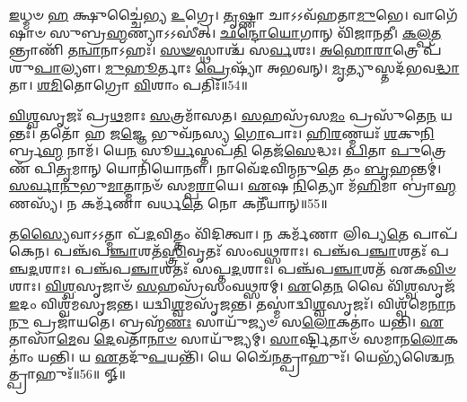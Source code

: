    \ul{𑌇}\-𑌧𑍍𑌮𑍞 \ul{𑌹} 𑌕𑍍𑌷𑍁𑌚𑍍𑌚𑍈॑𑌭𑍍𑌯 \ul{𑌉}\-𑌗𑍍𑌰𑍇।
   \ul{𑌤𑍃}\-𑌷𑍍𑌣𑌾 𑌚𑌾𑌽𑌽𑌵᳴𑌹𑌤𑌾\-\ul{𑌮𑍁}\-𑌭𑍇।
   𑌵𑌾𑌗𑍇᳴𑌷𑌾𑍞 𑌸𑍁𑌬𑍍𑌰\-\ul{𑌹𑍍𑌮}\-𑌣𑍍𑌯𑌾𑌽𑌽𑌸𑍀॑𑌤𑍍।
   \ul{𑌛}\-\-\ul{𑌨𑍍𑌦𑍋}\-\-\ul{𑌯𑍋}\-𑌗𑌾𑌨𑍍 𑌵𑌿᳴𑌜𑌾\-\ul{𑌨}\-𑌤𑍀।
   \ul{𑌕}\-\-\ul{𑌲𑍍𑌪}\-\-\ul{𑌤}\-𑌨𑍍𑌤𑍍𑌰𑌾𑌣𑌿᳴ 𑌤\-\ul{𑌨𑍍𑌵𑌾}\-𑌨𑌾𑌽𑌹𑌃᳴।
   \ul{𑌸}\-\-\ul{𑍟}\-𑌸𑍍𑌥𑌾𑌶𑍍𑌚᳴ 𑌸\-\ul{𑌰𑍍𑌵}\-𑌶𑌃।
   \ul{𑌅}\-\-\ul{𑌹𑍋}\-\-\ul{𑌰𑌾}\-𑌤𑍍𑌰𑍇 𑌪᳴𑌶𑍁\-\ul{𑌪𑌾}\-𑌲𑍍𑌯𑍗।
   \ul{𑌮𑍁}\-\-\ul{𑌹𑍂}\-𑌰𑍍𑌤𑌾𑌃 \ul{𑌪𑍍𑌰𑍇}\-𑌷𑍍𑌯𑌾᳴ 𑌅𑌭𑌵𑌨𑍍।
   \ul{𑌮𑍃}\-𑌤𑍍𑌯𑍁𑌸𑍍𑌤𑌦᳴𑌭𑌵\-\ul{𑌦𑍍𑌧𑌾}\-𑌤𑌾।
   \ul{𑌶}\-\-\ul{𑌮𑌿}\-𑌤𑍋𑌗𑍍𑌰𑍋 \ul{𑌵𑌿}\-𑌶𑌾𑌂 𑌪𑌤𑌿𑌃᳴॥54॥

   \ul{𑌵𑌿}\-\-\ul{𑌶𑍍𑌵}\-𑌸𑍃𑌜𑌃᳴ 𑌪𑍍𑌰\-\ul{𑌥}\-𑌮𑌾𑌃 \ul{𑌸}\-𑌤𑍍𑌰𑌮𑌾᳴𑌸𑌤।
   \ul{𑌸}\-𑌹𑌸𑍍𑌰᳴𑌸\-\ul{𑌮𑌂} 𑌪𑍍𑌰𑌸𑍁᳴𑌤𑍇\-\ul{𑌨} 𑌯𑌨𑍍𑌤𑌃᳴।
   𑌤𑌤𑍋᳴ 𑌹 𑌜\-\ul{𑌜𑍍𑌞𑍇} 𑌭𑍁𑌵᳴𑌨𑌸𑍍𑌯 \ul{𑌗𑍋}\-𑌪𑌾𑌃।
   \ul{𑌹𑌿}\-\-\ul{𑌰}\-𑌣𑍍𑌮𑌯𑌃᳴ \ul{𑌶}\-𑌕𑍁\-\ul{𑌨𑌿}\-𑌰𑍍𑌬𑍍𑌰\-\ul{𑌹𑍍𑌮} 𑌨𑌾𑌮᳴।
   𑌯𑍇\-\ul{𑌨} 𑌸𑍂\-\ul{𑌰𑍍𑌯}\-𑌸𑍍𑌤𑌪᳴\-\ul{𑌤𑌿} 𑌤𑍇𑌜᳴\-\ul{𑌸𑍇}\-𑌦𑍍𑌧𑌃।
   \ul{𑌪𑌿}\-𑌤𑌾 \ul{𑌪𑍁}\-𑌤𑍍𑌰𑍇𑌣᳴ 𑌪𑌿\-\ul{𑌤𑍃}\-𑌮𑌾𑌨𑍍 𑌯𑍋𑌨𑌿᳴𑌯𑍋𑌨𑍗।
   𑌨𑌾𑌵𑍇᳴𑌦𑌵𑌿𑌨𑍍𑌮𑌨𑍁\-\ul{𑌤𑍇} 𑌤𑌂 \ul{𑌬𑍃}\-𑌹𑌨𑍍𑌤𑌮𑍍॑।
   \ul{𑌸}\-\-\ul{𑌰𑍍𑌵𑌾}\-\-\ul{𑌨𑍁}\-𑌭𑍁\-\ul{𑌮𑌾}\-𑌤𑍍𑌮𑌾𑌨𑍞᳴ 𑌸𑌮𑍍𑌪\-\ul{𑌰𑌾}\-𑌯𑍇।
   \ul{𑌏}\-𑌷 \ul{𑌨𑌿}\-𑌤𑍍𑌯𑍋 𑌮᳴\-\ul{𑌹𑌿}\-𑌮𑌾 𑌬𑍍𑌰𑌾॑\-\ul{𑌹𑍍𑌮}\-𑌣𑌸𑍍𑌯᳴।
   𑌨 𑌕𑌰𑍍𑌮᳴𑌣𑌾 𑌵𑌰𑍍𑌧\-\ul{𑌤𑍇} 𑌨𑍋 𑌕𑌨𑍀᳴𑌯𑌾𑌨𑍍॥55॥

   𑌤\-\ul{𑌸𑍍𑌯𑍈}\-𑌵𑌾𑌽𑌽𑌤𑍍𑌮𑌾 𑌪᳴\-\ul{𑌦}\-𑌵𑌿𑌤𑍍𑌤𑌂 𑌵𑌿᳴𑌦𑌿𑌤𑍍𑌵𑌾।
   𑌨 𑌕𑌰𑍍𑌮᳴𑌣𑌾 𑌲𑌿𑌪𑍍𑌯\-\ul{𑌤𑍇} 𑌪𑌾𑌪᳴𑌕𑍇𑌨।
   𑌪𑌞𑍍𑌚᳴𑌪\-\ul{𑌞𑍍𑌚𑌾}\-𑌶𑌤᳴\-\ul{𑌸𑍍𑌤𑍍𑌰𑌿}\-𑌵𑍃𑌤𑌃᳴ 𑌸𑌂𑌵\-\ul{𑌥𑍍𑌸}\-𑌰𑌾𑌃।
   𑌪𑌞𑍍𑌚᳴𑌪\-\ul{𑌞𑍍𑌚𑌾}\-𑌶𑌤𑌃᳴ 𑌪𑌞𑍍𑌚\-\ul{𑌦}\-𑌶𑌾𑌃।
   𑌪𑌞𑍍𑌚᳴𑌪\-\ul{𑌞𑍍𑌚𑌾}\-𑌶𑌤𑌃᳴ 𑌸𑌪𑍍𑌤\-\ul{𑌦}\-𑌶𑌾𑌃।
   𑌪𑌞𑍍𑌚᳴𑌪\-\ul{𑌞𑍍𑌚𑌾}\-𑌶𑌤᳴ 𑌏𑌕\-\ul{𑌵𑌿}\-\-\ul{𑍞}\-𑌶𑌾𑌃।
   \ul{𑌵𑌿}\-\-\ul{𑌶𑍍𑌵}\-𑌸𑍃𑌜𑌾𑍞᳴ \ul{𑌸}\-𑌹𑌸𑍍𑌰᳴𑌸𑌂𑌵𑌥𑍍𑌸𑌰𑌮𑍍।
   \ul{𑌏}\-𑌤𑍇\-\ul{𑌨} 𑌵𑍈 𑌵𑌿᳴\-\ul{𑌶𑍍𑌵}\-𑌸𑍃𑌜᳴ \ul{𑌇}\-𑌦𑌂 𑌵𑌿𑌶𑍍𑌵᳴𑌮𑌸𑍃𑌜𑌨𑍍𑌤।
   𑌯𑌦𑍍𑌵𑌿\-\ul{𑌶𑍍𑌵}\-𑌮𑌸𑍃᳴𑌜𑌨𑍍𑌤।
   𑌤𑌸𑍍𑌮𑌾॑𑌦𑍍𑌵𑌿\-\ul{𑌶𑍍𑌵}\-𑌸𑍃𑌜𑌃᳴।
   𑌵𑌿𑌶𑍍𑌵᳴𑌮𑍇\-\ul{𑌨𑌾}\-𑌨\-\ul{𑌨𑍁} 𑌪𑍍𑌰𑌜𑌾᳴𑌯𑌤𑍇।
   𑌬𑍍𑌰𑌹𑍍𑌮᳴\-\ul{𑌣𑌃} 𑌸𑌾𑌯𑍁᳴𑌜𑍍𑌯𑍞 𑌸\-\ul{𑌲𑍋}\-𑌕𑌤𑌾𑌂॑ 𑌯𑌨𑍍𑌤𑌿।
   \ul{𑌏}\-𑌤𑌾𑌸𑌾᳴\-\ul{𑌮𑍇}\-𑌵 \ul{𑌦𑍇}\-𑌵𑌤𑌾᳴\-\ul{𑌨𑌾}\-\-\ul{𑍞} 𑌸𑌾𑌯𑍁᳴𑌜𑍍𑌯𑌮𑍍।
   \ul{𑌸𑌾}\-𑌰𑍍𑌷𑍍𑌟𑌿𑌤𑌾𑍞᳴ 𑌸𑌮𑌾𑌨\-\ul{𑌲𑍋}\-𑌕𑌤𑌾𑌂॑ 𑌯𑌨𑍍𑌤𑌿।
   𑌯 \ul{𑌏}\-𑌤𑌦𑍁᳴\-\ul{𑌪}\-𑌯𑌨𑍍𑌤𑌿᳴।
   𑌯𑍇 𑌚𑍈᳴\-\ul{𑌨}\-𑌤𑍍𑌪𑍍𑌰𑌾𑌹𑍁𑌃᳴।
   𑌯𑍇𑌭𑍍𑌯᳴𑌶𑍍𑌚𑍈\-\ul{𑌨}\-𑌤𑍍𑌪𑍍𑌰𑌾𑌹𑍁𑌃᳴॥56॥
 𑍐॥


\closesection
